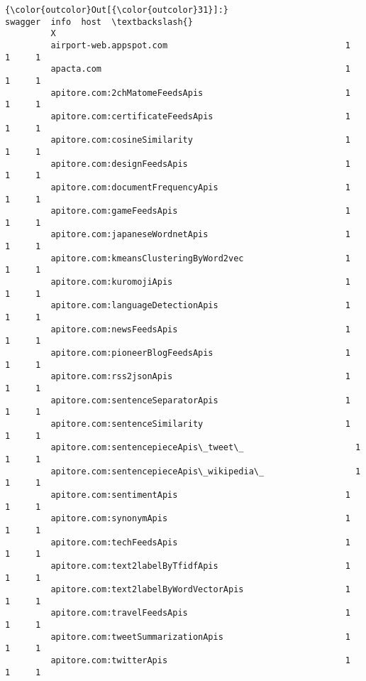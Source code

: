 \documentclass[11pt]{article}
\begin{document}
\begin{Verbatim}[commandchars=\\\{\}]
{\color{outcolor}Out[{\color{outcolor}31}]:}                                                     swagger  info  host  \textbackslash{}
         X                                                                         
         airport-web.appspot.com                                   1     1     1   
         apacta.com                                                1     1     1   
         apitore.com:2chMatomeFeedsApis                            1     1     1   
         apitore.com:certificateFeedsApis                          1     1     1   
         apitore.com:cosineSimilarity                              1     1     1   
         apitore.com:designFeedsApis                               1     1     1   
         apitore.com:documentFrequencyApis                         1     1     1   
         apitore.com:gameFeedsApis                                 1     1     1   
         apitore.com:japaneseWordnetApis                           1     1     1   
         apitore.com:kmeansClusteringByWord2vec                    1     1     1   
         apitore.com:kuromojiApis                                  1     1     1   
         apitore.com:languageDetectionApis                         1     1     1   
         apitore.com:newsFeedsApis                                 1     1     1   
         apitore.com:pioneerBlogFeedsApis                          1     1     1   
         apitore.com:rss2jsonApis                                  1     1     1   
         apitore.com:sentenceSeparatorApis                         1     1     1   
         apitore.com:sentenceSimilarity                            1     1     1   
         apitore.com:sentencepieceApis\_tweet\_                      1     1     1   
         apitore.com:sentencepieceApis\_wikipedia\_                  1     1     1   
         apitore.com:sentimentApis                                 1     1     1   
         apitore.com:synonymApis                                   1     1     1   
         apitore.com:techFeedsApis                                 1     1     1   
         apitore.com:text2labelByTfidfApis                         1     1     1   
         apitore.com:text2labelByWordVectorApis                    1     1     1   
         apitore.com:travelFeedsApis                               1     1     1   
         apitore.com:tweetSummarizationApis                        1     1     1   
         apitore.com:twitterApis                                   1     1     1   

\end{Verbatim}
\end{document}
